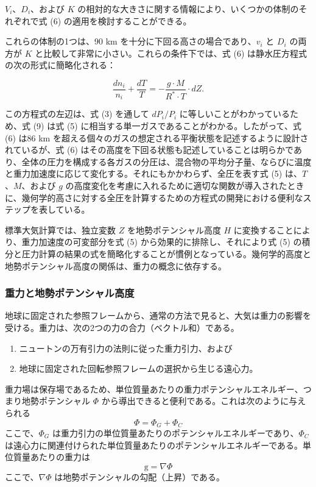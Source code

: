\documentclass{article}
\begin{document}
$V_i$、$D_i$、および $K$ の相対的な大きさに関する情報により、いくつかの体制のそれぞれで式 (6) の適用を検討することができる。

これらの体制の1つは、90 km を十分に下回る高さの場合であり、$v_i$ と $D_i$ の両方が $K$ と比較して非常に小さい。これらの条件下では、式 (6) は静水圧方程式の次の形式に簡略化される：

\[
\frac{d n_i}{n_i} + \frac{dT}{T} = -\frac{g \cdot M}{R^* \cdot T} \cdot dZ. \tag{9}
\]

この方程式の左辺は、式 (3) を通して $dP_i / P_i$ に等しいことがわかっているため、式 (9) は式 (5) に相当する単一ガスであることがわかる。したがって、式 (6) は86 km を超える個々のガスの想定される平衡状態を記述するように設計されているが、式 (6) はその高度を下回る状態も記述していることは明らかであり、全体の圧力を構成する各ガスの分圧は、混合物の平均分子量、ならびに温度と重力加速度に応じて変化する。それにもかかわらず、全圧を表す式 (5) は、$T$、$M$、および $g$ の高度変化を考慮に入れるために適切な関数が導入されたときに、幾何学的高さに対する全圧を計算するための方程式の開発における便利なステップを表している。

標準大気計算では、独立変数 $Z$ を地勢ポテンシャル高度 $H$ に変換することにより、重力加速度の可変部分を式 (5) から効果的に排除し、それにより式 (5) の積分と圧力計算の結果の式を簡略化することが慣例となっている。幾何学的高度と地勢ポテンシャル高度の関係は、重力の概念に依存する。

\subsubsection{重力と地勢ポテンシャル高度}

地球に固定された参照フレームから、通常の方法で見ると、大気は重力の影響を受ける。重力は、次の2つの力の合力（ベクトル和）である。
\begin{enumerate}
    \item ニュートンの万有引力の法則に従った重力引力、および
    \item 地球に固定された回転参照フレームの選択から生じる遠心力。
\end{enumerate}

重力場は保存場であるため、単位質量あたりの重力ポテンシャルエネルギー、つまり地勢ポテンシャル $\Phi$ から導出できると便利である。これは次のように与えられる
\[
\Phi = \Phi_G + \Phi_C \tag{10}
\]
ここで、$\Phi_G$ は重力引力の単位質量あたりのポテンシャルエネルギーであり、$\Phi_C$ は遠心力に関連付けられた単位質量あたりのポテンシャルエネルギーである。単位質量あたりの重力は
\[
 \text{g} = \nabla \Phi \tag{11}
\]
ここで、$\nabla \Phi$ は地勢ポテンシャルの勾配（上昇）である。
\end{document}
